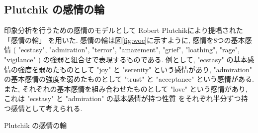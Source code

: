 \documentclass{jpreprint}
\begin{document}
\begin{multicols}{2}
\subsection{Plutchik の感情の輪}
印象分析を行うための感情のモデルとして
Robert Plutchikにより提唱された「感情の輪」\cite{RP01} を用いた.
感情の輪は図\ref{fig:woe}に示すように,
感情を8つの基本感情 
(
"ecstasy", 
"admiration", 
"terror", 
"amazement", 
"grief", 
"loathing", 
"rage", 
"vigilance"
)
の強弱と組合せで表現するものである.
例として, 
"ecstasy" の基本感情の強度を弱めたものとして "joy" と "serenity" という感情があり,
"admiration" の基本感情の強度を弱めたものとして "trust" と "acceptance" という感情がある.
また, それぞれの基本感情を組み合わせたものとして "love" という感情があり,
これは "ecstasy" と "admiration" の基本感情が持つ性質
をそれぞれ半分ずつ持つ感情として考えられる.

\begin{figurehere}
  \begin{center}
  \caption{Plutchik の感情の輪}
  \label{fig:woe}
  \end{center}
\end{figurehere}


\end{multicols}
\end{document}
